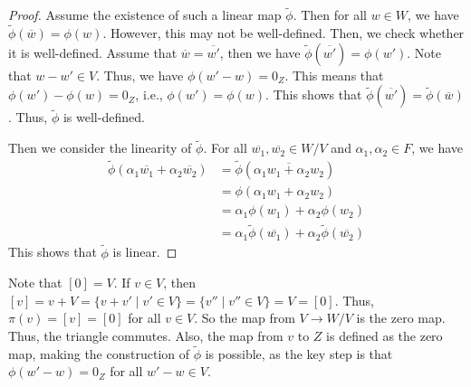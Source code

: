\documentclass[
	11pt, %
	fleqn, %
	a4paper, %
]{LegrandOrangeBook}
\renewcommand{\bar}[1]{\overline{#1}} %
\newcommand{\quotient}[2]{#1\! / #2} %
\begin{document}
\begin{proof}
    Assume the existence of such a linear map $\tilde{\phi}$. Then for all $w \in W$, we have $\tilde{\phi}(\bar{w}) = \phi(w)$. However, this may not be well-defined. Then, we check whether it is well-defined. Assume that $\bar{w} = \bar{w'}$, then we have $\tilde{\phi}(\bar{w'}) = \phi(w')$. Note that $w - w' \in V$. Thus, we have $\phi(w' - w) = 0_Z$. This means that $\phi(w') - \phi(w) = 0_Z$, i.e., $\phi(w') = \phi(w)$. This shows that $\tilde{\phi}(\bar{w'}) = \tilde{\phi}(\bar{w})$. Thus, $\tilde{\phi}$ is well-defined.

    Then we consider the linearity of $\tilde{\phi}$. For all $\bar{w_1}, \bar{w_2} \in \quotient{W}{V}$ and $\alpha_1, \alpha_2 \in F$, we have
    \[
        \begin{split}
            \tilde{\phi}(\alpha_1 \bar{w_1} + \alpha_2 \bar{w_2}) &= \tilde{\phi}(\overline{\alpha_1 w_1 + \alpha_2 w_2}) \\
            &= \phi(\alpha_1 w_1 + \alpha_2 w_2) \\
            &= \alpha_1 \phi(w_1) + \alpha_2 \phi(w_2) \\
            &= \alpha_1 \tilde{\phi}(\bar{w_1}) + \alpha_2 \tilde{\phi}(\bar{w_2})
        \end{split}
    \]
    This shows that $\tilde{\phi}$ is linear.
\end{proof}

\begin{remark}
    Note that $[0] = V$. If $v \in V$, then $[v] = v + V = \{v + v' \mid v' \in V\} = \{v'' \mid v'' \in V\} = V = [0]$. Thus, $\pi(v) = [v] = [0]$ for all $v \in V$. So the map from $V \to \quotient{W}{V}$ is the zero map. Thus, the triangle commutes. Also, the map from $v$ to $Z$ is defined as the zero map, making the construction of $\tilde{\phi}$ is possible, as the key step is that $\phi(w' - w) = 0_Z$ for all $w' - w \in V$.
\end{remark}




\end{document}
